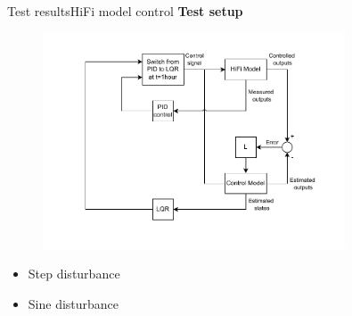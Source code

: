 \begin{frame}{Test results}{HiFi model control}
	 \textbf{Test setup}
	 \begin{figure}[h!]
	 	\centering
	 	\includegraphics[width=0.8\textwidth]{../Graphics/HiFi_simulation_test_diagram.pdf}
	 	\label{fig:test_setup}
	 \end{figure}
 \begin{itemize}
 	\item Step disturbance
 	\item Sine disturbance
 \end{itemize}
\end{frame}







%
%

